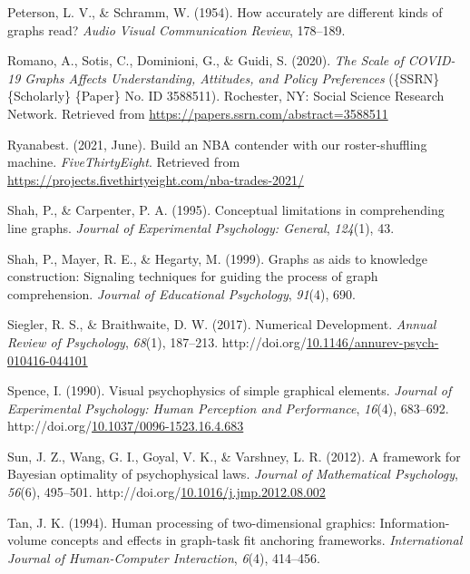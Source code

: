 \documentclass[print]{nuthesis}
\newlength{\cslhangindent}
\newenvironment{CSLReferences}%
{\setlength{\parindent}{0pt}%
\everypar{\setlength{\hangindent}{\cslhangindent}}\ignorespaces}%
{\par}
\begin{document}
\begin{CSLReferences}{1}{0}
\leavevmode\hypertarget{ref-peterson1954accurately}{}%
Peterson, L. V., \& Schramm, W. (1954). How accurately are different kinds of graphs read? \emph{Audio Visual Communication Review}, 178--189.

\leavevmode\hypertarget{ref-romano_scale_2020}{}%
Romano, A., Sotis, C., Dominioni, G., \& Guidi, S. (2020). \emph{The {Scale} of {COVID}-19 {Graphs} {Affects} {Understanding}, {Attitudes}, and {Policy} {Preferences}} (\{SSRN\} \{Scholarly\} \{Paper\} No. ID 3588511). Rochester, NY: Social Science Research Network. Retrieved from \url{https://papers.ssrn.com/abstract=3588511}

\leavevmode\hypertarget{ref-ryanabest_2021}{}%
Ryanabest. (2021, June). Build an NBA contender with our roster-shuffling machine. \emph{FiveThirtyEight}. Retrieved from \url{https://projects.fivethirtyeight.com/nba-trades-2021/}

\leavevmode\hypertarget{ref-shah1995conceptual}{}%
Shah, P., \& Carpenter, P. A. (1995). Conceptual limitations in comprehending line graphs. \emph{Journal of Experimental Psychology: General}, \emph{124}(1), 43.

\leavevmode\hypertarget{ref-shah1999graphs}{}%
Shah, P., Mayer, R. E., \& Hegarty, M. (1999). Graphs as aids to knowledge construction: Signaling techniques for guiding the process of graph comprehension. \emph{Journal of Educational Psychology}, \emph{91}(4), 690.

\leavevmode\hypertarget{ref-siegler_numerical_2017}{}%
Siegler, R. S., \& Braithwaite, D. W. (2017). Numerical {Development}. \emph{Annual Review of Psychology}, \emph{68}(1), 187--213. http://doi.org/\href{https://doi.org/10.1146/annurev-psych-010416-044101}{10.1146/annurev-psych-010416-044101}

\leavevmode\hypertarget{ref-spence_visual_1990}{}%
Spence, I. (1990). Visual psychophysics of simple graphical elements. \emph{Journal of Experimental Psychology: Human Perception and Performance}, \emph{16}(4), 683--692. http://doi.org/\href{https://doi.org/10.1037/0096-1523.16.4.683}{10.1037/0096-1523.16.4.683}

\leavevmode\hypertarget{ref-sun_framework_2012}{}%
Sun, J. Z., Wang, G. I., Goyal, V. K., \& Varshney, L. R. (2012). A framework for {Bayesian} optimality of psychophysical laws. \emph{Journal of Mathematical Psychology}, \emph{56}(6), 495--501. http://doi.org/\href{https://doi.org/10.1016/j.jmp.2012.08.002}{10.1016/j.jmp.2012.08.002}

\leavevmode\hypertarget{ref-tan1994human}{}%
Tan, J. K. (1994). Human processing of two-dimensional graphics: Information-volume concepts and effects in graph-task fit anchoring frameworks. \emph{International Journal of Human-Computer Interaction}, \emph{6}(4), 414--456.


\end{CSLReferences}
\end{document}
